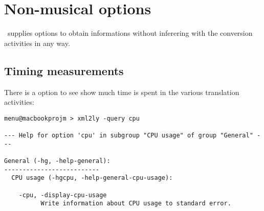 



\chapter{Non-musical options}

\mf\ supplies options to obtain informations without inferering with the conversion activities in any way.


\section{Timing measurements}

There is a  option to see show much time is spent in the various translation activities:
\begin{lstlisting}[language=MusicXML]
menu@macbookprojm > xml2ly -query cpu

--- Help for option 'cpu' in subgroup "CPU usage" of group "General" ---

General (-hg, -help-general):
--------------------------
  CPU usage (-hgcpu, -help-general-cpu-usage):

    -cpu, -display-cpu-usage
          Write information about CPU usage to standard error.
\end{lstlisting}

